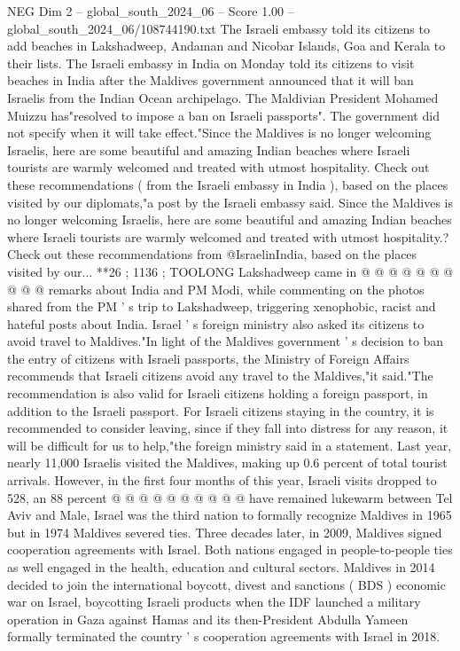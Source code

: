\begin{textsample}{NEG Dim 2 – global\_south\_2024\_06 – Score 1.00 – global\_south\_2024\_06/108744190.txt}  \label{ex:f2_neg_326}
The Israeli embassy told its citizens to add beaches in Lakshadweep, Andaman and Nicobar Islands, Goa and Kerala to their lists.
The Israeli embassy in India on Monday told its citizens to visit beaches in India after the Maldives government announced that it will ban Israelis from the Indian Ocean archipelago.
The Maldivian President Mohamed Muizzu has"resolved to impose a ban on Israeli passports".
The government did not specify when it will take effect."Since the Maldives is no longer welcoming Israelis, here are some beautiful and amazing Indian beaches where Israeli tourists are warmly welcomed and treated with utmost hospitality.
Check out these recommendations ( from the Israeli embassy in India ), based on the places visited by our diplomats,"a post by the Israeli embassy said.
Since the Maldives is no longer welcoming Israelis, here are some beautiful and amazing Indian beaches where Israeli tourists are warmly welcomed and treated with utmost hospitality.?
Check out these recommendations from @IsraelinIndia, based on the places visited by our... **26 ; 1136 ; TOOLONG Lakshadweep came in @ @ @ @ @ @ @ @ @ @ remarks about India and PM Modi, while commenting on the photos shared from the PM ' s trip to Lakshadweep, triggering xenophobic, racist and hateful posts about India.
Israel ' s foreign ministry also asked its citizens to avoid travel to Maldives."In light of the Maldives government ' s decision to ban the entry of citizens with Israeli passports, the Ministry of Foreign Affairs recommends that Israeli citizens avoid any travel to the Maldives,"it said."The recommendation is also valid for Israeli citizens holding a foreign passport, in addition to the Israeli passport.
For Israeli citizens staying in the country, it is recommended to consider leaving, since if they fall into distress for any reason, it will be difficult for us to help,"the foreign ministry said in a statement.
Last year, nearly 11,000 Israelis visited the Maldives, making up 0.6 percent of total tourist arrivals.
However, in the first four months of this year, Israeli visits dropped to 528, an 88 percent @ @ @ @ @ @ @ @ @ @ have remained lukewarm between Tel Aviv and Male, Israel was the third nation to formally recognize Maldives in 1965 but in 1974 Maldives severed ties.
Three decades later, in 2009, Maldives signed cooperation agreements with Israel.
Both nations engaged in people-to-people ties as well engaged in the health, education and cultural sectors.
Maldives in 2014 decided to join the international boycott, divest and sanctions ( BDS ) economic war on Israel, boycotting Israeli products when the IDF launched a military operation in Gaza against Hamas and its then-President Abdulla Yameen formally terminated the country ' s cooperation agreements with Israel in 2018.

\end{textsample}
